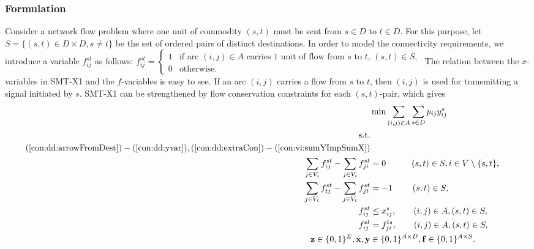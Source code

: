 \subsubsection{Formulation}
\label{sec:smtx2:form}
Consider a network flow problem where one unit of commodity $(s,t)$ must be sent from $s\in D$ to $t\in D$. For this purpose, let $S=\{(s,t)\in D\times D, s\neq t\}$ be the set of ordered pairs of distinct destinations. In order to model the connectivity requirements, we introduce a variable $f^{st}_{ij}$ as follows:
\newline\newline
  $f_{ij}^{st}=
	\begin{cases}
    1 & \text{if arc $(i,j) \in A$ carries 1 unit of flow from $s$ to $t$, $(s,t)\in S$},\\
    0 & \text{otherwise}.
  \end{cases}$
\newline\newline
The relation between the $x$-variables in SMT-X1 and the $f$-variables is easy to see. If an arc $(i,j)$ carries a flow from $s$ to $t$, then $(i,j)$ is used for transmitting a signal initiated by $s$.
SMT-X1 can be strengthened by flow conservation constraints for each $(s,t)$-pair, which gives 
\newline
\newline    
\begin{subequations}\label{eq:smt-x2}
\begin{flalign}
\label{objective:dd} \makebox[0pt][l]{$\displaystyle{} \min \sum\limits_{(i,j) \in A} \sum\limits_{s \in D} p_{ij} y^s_{ij} $}  \\ 
\text{s.t.}    \notag   \\	
(\ref{con:dd:arrowFromDest}) - (\ref{con:dd:yvar}), (\ref{con:dd:extraCon}) -  (\ref{con:vi:sumYImpSumX}) \notag \\ 
 \label{con:mf:flowNormal}  \sum\limits_{\substack{ j\in V_i}}f^{st}_{ij}-\sum\limits_{\substack{j\in V_i }}f^{st}_{ji}    & = 0   \quad \quad\quad 			  (s,t)\in S, i\in V\setminus\{s,t\}, &\\	
\label{con:mf:flowDest}  \sum\limits_{\substack{ j\in V_t }}f^{st}_{tj}-\sum\limits_{\substack{j\in V_t}}f^{st}_{jt}    & = -1  \quad\quad ~ (s,t)\in S, &\\	
 \label{con:mf:fcap}   f^{st}_{ij} &\leq  x^{s}_{ij},\quad\quad    (i,j)\in A, (s,t)\in S, & \\ 		 			 	 
 \label{con:mf:fsym}   f^{st}_{ij} &=  f^{ts}_{ji},  \quad\quad(i,j)\in A, (s,t)\in S, &\\   
\label{con:mf:xydim}	\mathbf{z} \in \{0,1\}^{E}, \mathbf{x},\mathbf{y} &\in \{0,1\}^{A\times D},  \mathbf{f}\in\{0,1\}^{A\times S}. 
\end{flalign}~
\end{subequations}  
